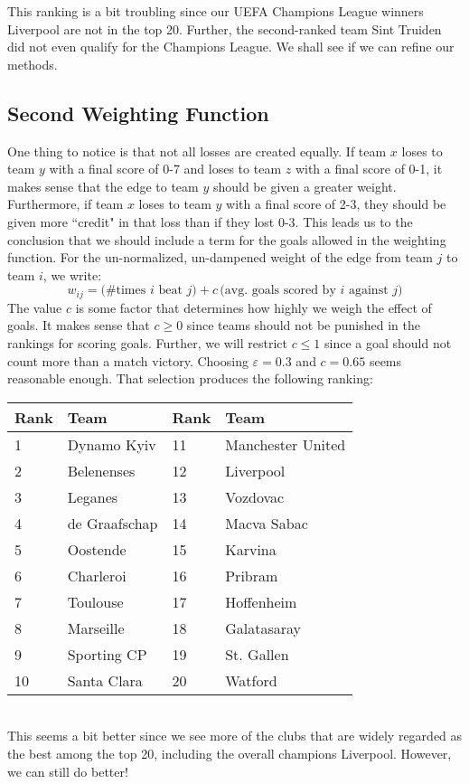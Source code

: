 \documentclass[10pt]{article}
\begin{document}
This ranking is a bit troubling since our UEFA Champions League winners Liverpool are not in the top 20. Further, the second-ranked team Sint Truiden did not even qualify for the Champions League. We shall see if we can refine our methods.
\subsection{Second Weighting Function}
One thing to notice is that not all losses are created equally. If team $x$ loses to team $y$ with a final score of 0-7 and loses to team $z$ with a final score of 0-1, it makes sense that the edge to team $y$ should be given a greater weight. Furthermore, if team $x$ loses to team $y$ with a final score of 2-3, they should be given more ``credit" in that loss than if they lost 0-3. This leads us to the conclusion that we should include a term for the goals allowed in the weighting function. For the un-normalized, un-dampened weight of the edge from team $j$ to team $i$, we write:
\[w_{ij} = \big(\text{\# times $i$ beat $j$}\big) + c\,\big(\text{avg. goals scored by $i$ against $j$}\big)\]
The value $c$ is some factor that determines how highly we weigh the effect of goals. It makes sense that $c\geq 0$ since teams should not be punished in the rankings for scoring goals. Further, we will restrict $c\leq 1$ since a goal should not count more than a match victory. Choosing $\varepsilon=0.3$ and $c=0.65$ seems reasonable enough. That selection produces the following ranking:
\begin{table}[h!]
\centering
\begin{tabular}{ll|ll}
Rank & Team          & Rank & Team              \\ \hline
1    & Dynamo Kyiv   & 11   & Manchester United \\
2    & Belenenses    & 12   & Liverpool         \\
3    & Leganes       & 13   & Vozdovac          \\
4    & de Graafschap & 14   & Macva Sabac       \\
5    & Oostende      & 15   & Karvina           \\
6    & Charleroi     & 16   & Pribram           \\
7    & Toulouse      & 17   & Hoffenheim        \\
8    & Marseille     & 18   & Galatasaray       \\
9    & Sporting CP   & 19   & St. Gallen        \\
10   & Santa Clara   & 20   & Watford          
\end{tabular}
\end{table}\\
This seems a bit better since we see more of the clubs that are widely regarded as the best among the top 20, including the overall champions Liverpool. However, we can still do better!
\end{document}
